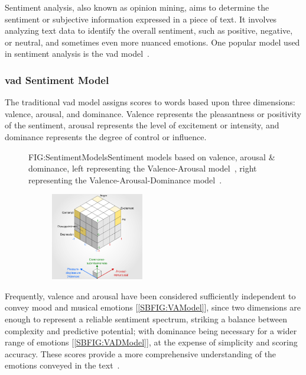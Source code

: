 Sentiment analysis, also known as opinion mining, aims to determine the sentiment or subjective information expressed in a piece of text. It involves analyzing text data to identify the overall sentiment, such as positive, negative, or neutral, and sometimes even more nuanced emotions. One popular model used in sentiment analysis is the \ac{vad} model~\cite{WIKI:EMOTION-CLASSIFICATION}.

\subsubsection{\acs{vad} Sentiment Model}

The traditional \acs{vad} model assigns scores to words based upon three dimensions: valence, arousal, and dominance. Valence represents the pleasantness or positivity of the sentiment, arousal represents the level of excitement or intensity, and dominance represents the degree of control or influence.

\begin{figure}[Valence-Arousal-Dominance sentiment models]{FIG:SentimentModels}{Sentiment models based on valence, arousal \& dominance, left representing the Valence-Arousal model~\cite{WIKI:VA-MODEL}, right representing the Valence-Arousal-Dominance model~\cite{WIKI:PAD-MODEL}.}
    \begin{subfigure}[SBFIG:VAModel]{Circumplex Valence-Arousal model}{}
    \end{subfigure}
    \begin{subfigure}[SBFIG:VADModel]{Three-dimensional Valence-Arousal-Dominance model}{\includegraphics[width=0.445\textwidth]{img/VADModel.png}}
    \end{subfigure}
\end{figure}

Frequently, valence and arousal have been considered sufficiently independent to convey mood and musical emotions [\ref{SBFIG:VAModel}], since two dimensions are enough to represent a reliable sentiment spectrum, striking a balance between complexity and predictive potential; with dominance being necessary for a wider range of emotions [\ref{SBFIG:VADModel}], at the expense of simplicity and scoring accuracy. These scores provide a more comprehensive understanding of the emotions conveyed in the text~\cite{EMOTION-MODELS}.

